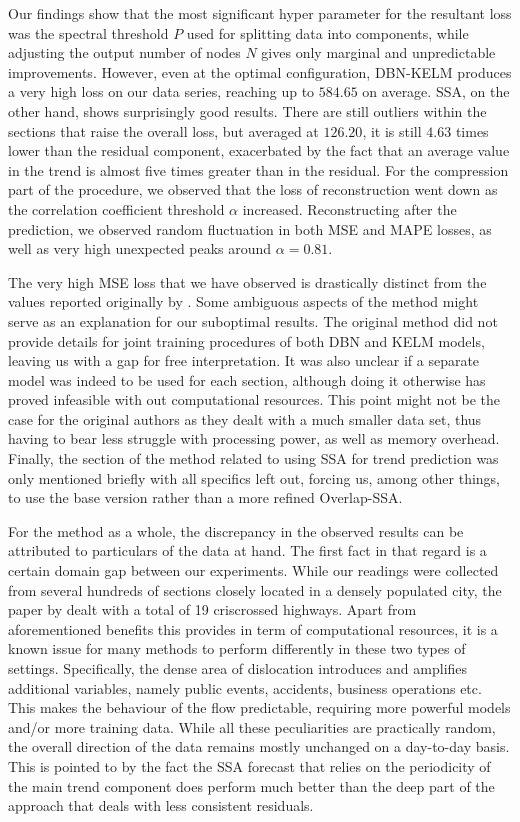 Our findings show that the most significant hyper parameter for the resultant
loss was the spectral threshold $P$ used for splitting data into components,
while adjusting the output number of nodes $N$ gives only marginal and
unpredictable improvements. However, even at the optimal configuration, DBN-KELM
produces a very high loss on our data series, reaching up to $584.65$ on
average. SSA, on the other hand, shows surprisingly good results. There are
still outliers within the sections that raise the overall loss, but averaged at
$126.20$, it is still $4.63$ times lower than the residual component,
exacerbated by the fact that an average value in the trend is almost five times
greater than in the residual. For the compression part of the procedure, we
observed that the loss of reconstruction went down as the correlation
coefficient threshold $\alpha$ increased. Reconstructing after the prediction,
we observed random fluctuation in both MSE and MAPE losses, as well as very high
unexpected peaks around $\alpha=0.81$.

The very high MSE loss that we have observed is drastically distinct from the
values reported originally by \citet{Han.2020}. Some ambiguous aspects of the
method might serve as an explanation for our suboptimal results. The original
method did not provide details for joint training procedures of both DBN and
KELM models, leaving us with a gap for free interpretation. It was also unclear
if a separate model was indeed to be used for each section, although doing it
otherwise has proved infeasible with out computational resources. This point
might not be the case for the original authors as they dealt with a much smaller
data set, thus having to bear less struggle with processing power, as well as
memory overhead. Finally, the section of the method related to using SSA for
trend prediction was only mentioned briefly with all specifics left out, forcing
us, among other things, to use the base version rather than a more refined
Overlap-SSA.

For the method as a whole, the discrepancy in the observed results can be
attributed to particulars of the data at hand. The first fact in that regard is
a certain domain gap between our experiments. While our readings were collected
from several hundreds of sections closely located in a densely populated city,
the paper by \citet{Han.2020} dealt with a total of 19 criscrossed highways.
Apart from aforementioned benefits this provides in term of computational
resources, it is a known issue for many methods to perform differently in these
two types of settings. Specifically, the dense area of dislocation introduces
and amplifies additional variables, namely public events, accidents, business
operations etc. This makes the behaviour of the flow predictable, requiring more
powerful models and/or more training data. While all these peculiarities are
practically random, the overall direction of the data remains mostly unchanged
on a day-to-day basis. This is pointed to by the fact the SSA forecast that
relies on the periodicity of the main trend component does perform much better
than the deep part of the approach that deals with less consistent residuals.

